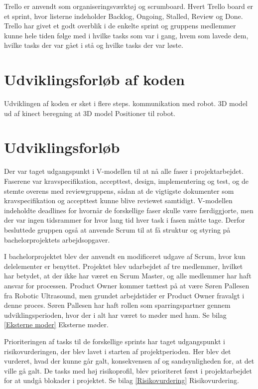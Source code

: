 Trello er anvendt som organiseringsværktøj og scrumboard. Hvert Trello board er et sprint, hvor listerne indeholder Backlog, Ongoing, Stalled, Review og Done. Trello har givet et godt overblik i de enkelte sprint og gruppens medlemmer kunne hele tiden følge med i hvilke tasks som var i gang, hvem som lavede dem, hvilke tasks der var gået i stå og hvilke tasks der var løste. 

\section{Udviklingsforløb af koden}
Udviklingen af koden er sket i flere steps. 
kommunikation med robot.  
3D model ud af kinect
beregning at 3D model
Positioner til robot.

\section{Udviklingsforløb}
Der var taget udgangspunkt i V-modellen til at nå alle faser i projektarbejdet. Faserene var kravspecifikation, accepttest, design, implementering og test, og de stemte overens med reviewgruppens, sådan at de vigtigste dokumenter som kravspecifikation og accepttest kunne blive reviewet samtidigt. V-modellen indeholdte deadlines for hvornår de forskellige faser skulle være færdiggjorte, men der var ingen tidsrammer for hvor lang tid hver task i fasen måtte tage. Derfor besluttede gruppen også at anvende Scrum til at få struktur og styring på bachelorprojektets arbejdsopgaver.

I bachelorprojektet blev der anvendt en modificeret udgave af Scrum, hvor kun delelementer er benyttet. Projektet blev udarbejdet af tre medlemmer, hvilket har betydet, at der ikke har været en Scrum Master, og alle medlemmer har haft ansvar for processen. Product Owner kommer tættest på at være Søren Pallesen fra Robotic Ultrasound, men grundet arbejdstider er Product Owner fravalgt i denne proces. Søren Pallesen har haft rollen som sparringspartner gennem udviklingsperioden, hvor der i alt har været to møder med ham. Se bilag \ref{Eksterne moder} Eksterne møder. 

Prioriteringen af tasks til de forskellige sprints har taget udgangspunkt i risikovurderingen, der blev lavet i starten af projektperioden. Her blev det vurderet, hvad der kunne går galt, konsekvensen af og sandsynligheden for, at det ville gå galt. De tasks med høj risikoprofil, blev prioriteret først i projektarbejdet for at undgå blokader i projektet. Se bilag \ref{Risikovurdering} Risikovurdering. 

